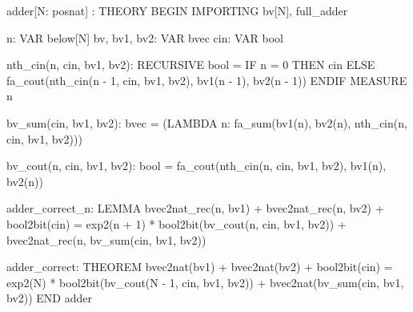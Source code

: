 adder[N: posnat] : THEORY
BEGIN
  IMPORTING bv[N], full_adder

  n: VAR below[N]
  bv, bv1, bv2: VAR bvec
  cin: VAR bool

  nth_cin(n, cin, bv1, bv2): RECURSIVE bool =
      IF n = 0 THEN cin
      ELSE fa_cout(nth_cin(n - 1, cin, bv1, bv2), bv1(n - 1), bv2(n - 1))
      ENDIF
    MEASURE n

  bv_sum(cin, bv1, bv2): bvec =
    (LAMBDA n: fa_sum(bv1(n), bv2(n), nth_cin(n, cin, bv1, bv2)))
      
  bv_cout(n, cin, bv1, bv2): bool =
    fa_cout(nth_cin(n, cin, bv1, bv2), bv1(n), bv2(n))
      
  adder_correct_n: LEMMA 
      bvec2nat_rec(n, bv1) + bvec2nat_rec(n, bv2) + bool2bit(cin)
        = exp2(n + 1) * bool2bit(bv_cout(n, cin, bv1, bv2))
          + bvec2nat_rec(n, bv_sum(cin, bv1, bv2))
    
  adder_correct: THEOREM 
      bvec2nat(bv1) + bvec2nat(bv2) + bool2bit(cin)
        = exp2(N) * bool2bit(bv_cout(N - 1, cin, bv1, bv2))
          + bvec2nat(bv_sum(cin, bv1, bv2))
END adder


